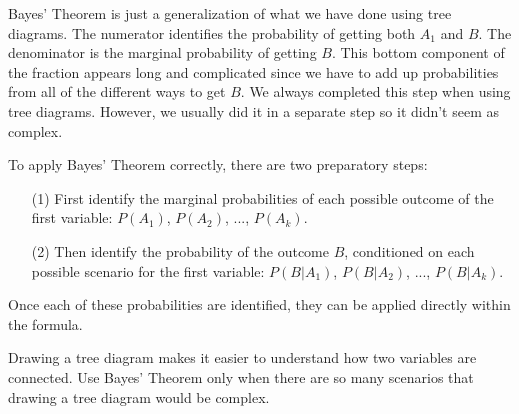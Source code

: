 Bayes' Theorem is just a generalization of what we have done using tree diagrams. The numerator identifies the probability of getting both $A_1$ and $B$. The denominator is the marginal probability of getting $B$. This bottom component of the fraction appears long and complicated since we have to add up probabilities from all of the different ways to get $B$. We always completed this step when using tree diagrams. However, we usually did it in a separate step so it didn't seem as complex.

To apply Bayes' Theorem correctly, there are two preparatory steps:
\begin{enumerate}
\setlength{\itemsep}{0mm}
\item[(1)] First identify the marginal probabilities of each possible outcome of the first variable: $P(A_1)$, $P(A_2)$, ..., $P(A_k)$.
\item[(2)] Then identify the probability of the outcome $B$, conditioned on each possible scenario for the first variable: $P(B | A_1)$, $P(B | A_2)$, ..., $P(B | A_k)$.
\end{enumerate}
Once each of these probabilities are identified, they can be applied directly within the formula.

\begin{tipBox}{
Drawing a tree diagram makes it easier to understand how two variables are connected. Use Bayes' Theorem only when there are so many scenarios that drawing a tree diagram would be complex.}
\end{tipBox}

\textC{\newpage}

